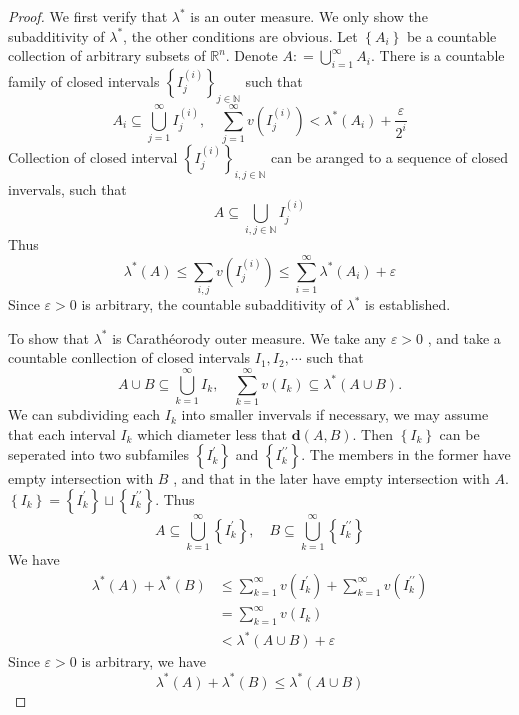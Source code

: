 \documentclass[../main.tex]{subfiles}
\begin{document}
\begin{proof}
    We first verify that \(   \lambda ^{*}  \) is an outer measure. We only show the subadditivity of \(   \lambda ^{*}  \), the other conditions are obvious. Let \( \left\{ A_{i} \right\}  \) be a countable collection of arbitrary subsets of \(  \mathbb{R} ^{n}  \). Denote \(  A: = \bigcup _{i = 1}^{\infty}A_{i}  \).       There is a countable family of closed intervals \(  \left\{ I _{j}^{\left( i \right) } \right\}_{j \in \mathbb{N} }  \) such that \[
    A_{i}\subseteq \bigcup _{j = 1}^{\infty} I^{\left( i \right) }_{j},\quad   \sum _{j = 1}^{\infty}v\left( I _{j}^{\left( i \right) } \right)<  \lambda ^{*}\left( A_{i} \right)+ \frac{ \varepsilon  }{2^{i} }   
    \] Collection of closed interval \(  \left\{ I _{j}^{\left( i \right) } \right\}_{i,j\in \mathbb{N} }  \)   can be aranged to a sequence of closed invervals, such that \[
    A\subseteq  \bigcup _{i,j\in \mathbb{N} } I^{\left( i \right) }_{j}
    \] Thus \[
     \lambda ^{*}\left( A \right)\le \sum _{i,j}v\left( I _{j}^{\left( i \right) } \right)\le \sum _{i = 1}^{\infty} \lambda ^{*}\left( A_{i} \right)+  \varepsilon    
    \] Since \(   \varepsilon > 0  \) is arbitrary, the countable subadditivity of \(   \lambda ^{*}  \) is established.      

    To show that \(   \lambda ^{*}  \) is Carath\'eorody outer measure. We take any \(   \varepsilon > 0  \) , and take a countable conllection of closed intervals \(  I_1,I_2,\cdots   \)   such that \[
    A\cup B\subseteq \bigcup _{ k= 1}^{\infty}I _{k},\quad  \sum _{k = 1}^{\infty}v\left( I _{k} \right)\subseteq  \lambda ^{*}\left( A\cup B \right).   
    \] We can subdividing each \(  I _{k}  \) into smaller invervals if necessary, we may assume that each interval \(   I _{k}  \) which diameter less that \(  \mathbf{d}\left( A,B \right)   \). Then \(  \left\{  I _{k} \right\}  \) can be seperated into two subfamiles \(  \left\{ I _{k}^{\prime}  \right\}  \) and \(  \left\{ I _{k}^{\prime \prime}  \right\}  \). The members in the former have empty intersection with \(  B  \) , and that  in the later have empty intersection with \(  A  \). \(  \left\{ I _{k} \right\}= \left\{ I _{k}^{\prime}  \right\} \sqcup \left\{ I _{k}^{\prime \prime}  \right\}  \). Thus \[
    A\subseteq \bigcup _{k = 1}^{\infty}\left\{ I _{k}^{\prime}  \right\},\quad B\subseteq \bigcup _{k= 1}^{\infty} \left\{ I _{k}^{\prime \prime}  \right\}
    \]          We have \[
    \begin{aligned}
     \lambda ^{*}\left( A \right)+  \lambda ^{*}\left( B \right)&\le  \sum _{k= 1}^{\infty}v\left( I _{k}^{\prime}  \right)+ \sum _{k = 1}^{\infty}v\left( I _{k}^{\prime \prime}  \right)     \\ 
      & = \sum _{ k= 1}^{\infty}v\left( I _{k} \right)\\ 
       &<   \lambda ^{*}\left( A\cup B \right)+  \varepsilon   
    \end{aligned}
    \] Since \(   \varepsilon > 0  \) is arbitrary, we have \[
     \lambda ^{*}\left( A \right)+  \lambda ^{*}\left( B \right)\le  \lambda ^{*}\left( A\cup B \right)   
    \] 
\end{proof}
\end{document}
